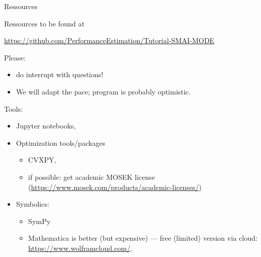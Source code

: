 \documentclass[aspectratio=169]{beamer}
\begin{document}
\begin{frame}{Ressources}

Ressources to be found at
\begin{center}
	\url{https://github.com/PerformanceEstimation/Tutorial-SMAI-MODE}
\end{center}

\medskip
Please:
\begin{itemize}
	\item do interrupt with questions!
	\item We will adapt the pace; program is probably optimistic.
\end{itemize}

\medskip
Tools:
\begin{itemize}
	\item Jupyter notebooks,
	\item Optimization tools/packages
	\begin{itemize}
		\item CVXPY,
		\item if possible: get academic MOSEK license (\url{https://www.mosek.com/products/academic-licenses/})
	\end{itemize}
	\item Symbolics: 
	\begin{itemize}
		\item SymPy
		\item Mathematica is better (but expensive) --- free (limited) version via cloud: \url{https://www.wolframcloud.com/}.
	\end{itemize}
\end{itemize}
\end{frame}
\end{document}
